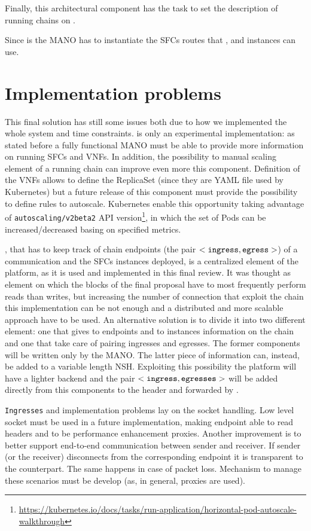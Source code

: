Finally, this architectural component has the task to set the description of
running chains on \roulette{}.

Since \harbor{} is the MANO has to instantiate the SFCs routes that 
\ingresses{}, \egresses{} and \astaire{} instances can use. 

\section{Implementation problems}
This final solution has still some issues both due to how we implemented the
whole system and time constraints. \harbor{} is only an experimental
implementation: as stated before a fully functional MANO must be able to provide
more information on running SFCs and VNFs. In addition, the possibility to
manual scaling element of a running chain can improve even more this component.
Definition of the VNFs allows to define the ReplicaSet (since they are YAML
file used by Kubernetes) but a future release of this component must provide
the possibility to define rules to autoscale. Kubernetes enable this
opportunity taking advantage of \texttt{autoscaling/v2beta2} API
version\footnote{\sloppy\url{https://kubernetes.io/docs/tasks/run-application/horizontal-pod-autoscale-walkthrough}},
in which the set of Pods can be increased/decreased basing on specified metrics.

\roulette{}, that has to keep track of chain endpoints (the pair $<\texttt{ingress}{},
\texttt{egress}{}>$) of a communication and the SFCs instances deployed, is a
centralized element of the platform, as it is used and implemented in this final
review. It was thought as element on which the blocks of the final proposal have
to most frequently perform reads than writes, but increasing the number of
connection that exploit the chain this implementation can be not enough and a
distributed and more scalable approach have to be used. An alternative solution
is to divide it into two different element: one that gives to endpoints and to 
\astaire{} instances information on the chain and one that take care of pairing
ingresses and egresses. The former components will be written only by the MANO.
The latter piece of information can, instead, be added to a variable length NSH.
Exploiting this possibility the platform will have a lighter backend and the
pair $<\texttt{ingress}{}, \texttt{egresses}{}>$ will be added directly from this components to
the header and forwarded by \astaire{}. 

\texttt{Ingresses} and \egresses{} implementation problems lay on the socket
handling. Low level socket must be used in a future implementation, making
endpoint able to read headers and to be performance enhancement proxies. Another
improvement is to better support end-to-end communication between sender and
receiver. If sender (or the receiver) disconnects from the corresponding
endpoint it is transparent to the counterpart. The same happens in case of
packet loss. Mechanism to manage these scenarios must be develop (as, in
general, proxies are used).

